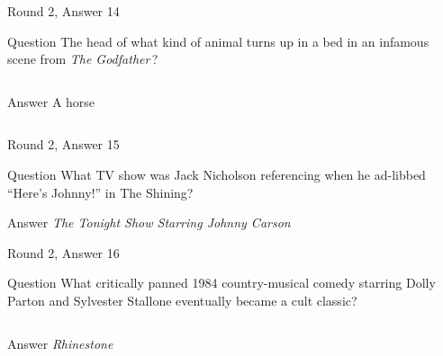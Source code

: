 \documentclass[11pt]{beamer}
\begin{document}
\begin{frame}[t]{Round 2, Answer 14}
  \vspace{2em}
  \begin{block}{Question}
    The head of what kind of animal turns up in a bed in an infamous scene from \emph{The Godfather}\,?
  \end{block}
  \pause{}
  \begin{columns}[T,totalwidth=\linewidth]
    \begin{column}{0.35\linewidth}
      \begin{block}{Answer}
        A horse
      \end{block}
    \end{column}
    \begin{column}{0.6\linewidth}
      \begin{center}
        \texttt{[image: \{Images/horse-head]}.jpg}
      \end{center}
    \end{column}
  \end{columns}
\end{frame}


\begin{frame}[t]{Round 2, Answer 15}
  \vspace{2em}
  \begin{block}{Question}
    What TV show was Jack Nicholson referencing when he ad-libbed ``Here's Johnny!'' in The Shining?
  \end{block}
  \pause{}
  \begin{block}{Answer}
    \emph{The Tonight Show Starring Johnny Carson}
  \end{block}
\end{frame}


\begin{frame}[t]{Round 2, Answer 16}
  \vspace{2em}
  \begin{block}{Question}
    What critically panned 1984 country-musical comedy starring Dolly Parton and Sylvester Stallone eventually became a cult classic?
  \end{block}
  \pause{}
  \begin{columns}[T,totalwidth=\linewidth]
    \begin{column}{0.35\linewidth}
      \begin{block}{Answer}
        \emph{Rhinestone}
      \end{block}
    \end{column}
    \begin{column}{0.6\linewidth}
      \begin{center}
        \texttt{[image: \{Images/rhinestone]}.jpg}
      \end{center}
    \end{column}
  \end{columns}
\end{frame}
\end{document}
